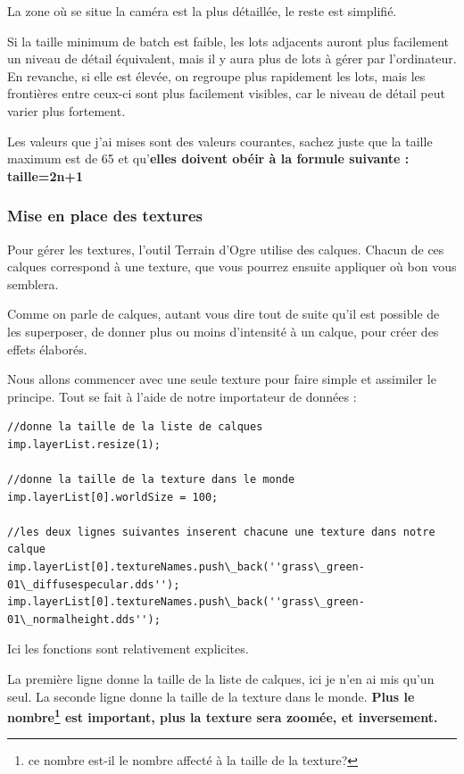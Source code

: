 \documentclass[10pt,a4paper]{report}
\begin{document}
La zone o\`u se situe la cam\'era est la plus d\'etaill\'ee, le reste est simplifi\'e.

Si la taille minimum de batch est faible, les lots adjacents auront plus facilement un niveau de d\'etail \'equivalent, mais il y aura plus de lots \`a g\'erer par l'ordinateur. En revanche, si elle est \'elev\'ee, on regroupe plus rapidement les lots, mais les fronti\`eres entre ceux-ci sont plus facilement visibles, car le niveau de d\'etail peut varier plus fortement.

Les valeurs que j'ai mises sont des valeurs courantes, sachez juste que la taille maximum est de 65 et qu'\textbf{elles doivent ob\'eir \`a la formule suivante :
taille=2n+1}



\subsubsection{Mise en place des textures}

Pour g\'erer les textures, l'outil Terrain d'Ogre utilise des calques. Chacun de ces calques correspond \`a une texture, que vous pourrez ensuite appliquer o\`u bon vous semblera.

Comme on parle de calques, autant vous dire tout de suite qu'il est possible de les superposer, de donner plus ou moins d'intensit\'e \`a un calque, pour cr\'eer des effets \'elabor\'es.

Nous allons commencer avec une seule texture pour faire simple et assimiler le principe. Tout se fait \`a l'aide de notre importateur de donn\'ees :

\begin{lstlisting}[caption={Mise en place d'une texture pour le terrain}]
//donne la taille de la liste de calques
imp.layerList.resize(1);

//donne la taille de la texture dans le monde
imp.layerList[0].worldSize = 100;  

//les deux lignes suivantes inserent chacune une texture dans notre calque
imp.layerList[0].textureNames.push\_back(''grass\_green-01\_diffusespecular.dds'');
imp.layerList[0].textureNames.push\_back(''grass\_green-01\_normalheight.dds'');
\end{lstlisting}

Ici les fonctions sont relativement explicites.

La premi\`ere ligne donne la taille de la liste de calques, ici je n'en ai mis qu'un seul. La seconde ligne donne la taille de la texture dans le monde. \textbf{Plus le nombre\footnote{ce nombre est-il le nombre affect\'e \`a la taille de la texture?} est important, plus la texture sera zoom\'ee, et inversement.}
\end{document}
